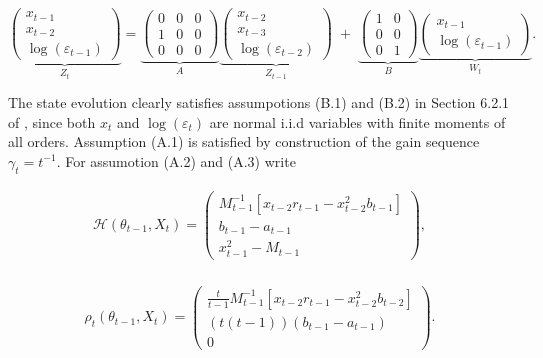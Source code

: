 \documentclass[11pt]{article}
\begin{document}
\begin{equation}
\underbrace{
\begin{pmatrix}
    x_{t-1} \\
    x_{t-2} \\
    \log(\varepsilon_{t-1})
\end{pmatrix}
}_{Z_t}
=
\underbrace{
\begin{pmatrix}
    0 & 0 & 0 \\
    1 & 0 & 0 \\
    0 & 0 & 0
\end{pmatrix}
}_{A}
\underbrace{
\begin{pmatrix}
    x_{t-2} \\
    x_{t-3} \\
    \log(\varepsilon_{t-2})
\end{pmatrix}
}_{Z_{t-1}}
\;+\;
\underbrace{
\begin{pmatrix}
    1 & 0 \\
    0 & 0 \\
    0 & 1
\end{pmatrix}
}_{B}
\underbrace{
\begin{pmatrix}
    x_{t-1} \\
    \log(\varepsilon_{t-1})
\end{pmatrix}
}_{W_t}.
\end{equation}

The state evolution clearly satisfies assumpotions (B.1) and (B.2) in Section 6.2.1 of \cite{GeorgeWEvans2001},
since both $x_t$ and $\log(\varepsilon_t)$ are normal i.i.d variables with finite moments of all orders.
Assumption (A.1) is satisfied by construction of the gain sequence $\gamma_t = t^{-1}$.
For assumotion (A.2) and (A.3) write 

\begin{equation}
    \begin{aligned}
        \mathcal{H}(\theta_{t-1}, X_t) = \begin{pmatrix}
        M^{-1}_{t-1} \left[ x_{t-2} r_{t-1} - x_{t-2}^2 b_{t-1} \right] \\
        b_{t-1} - a_{t-1} \\
        x_{t-1}^2 - M_{t-1}
    \end{pmatrix}, \\
    \end{aligned}
\end{equation}

\begin{equation}
    \begin{aligned}
        \rho_t(\theta_{t-1}, X_t) = \begin{pmatrix}
        \frac{t}{t-1} M^{-1}_{t-1} \left[ x_{t-2} r_{t-1} - x_{t-2}^2 b_{t-2} \right] \\
        (t(t-1))(b_{t-1} - a_{t-1}) \\
        0
    \end{pmatrix}. \\
    \end{aligned}
\end{equation}
\end{document}
